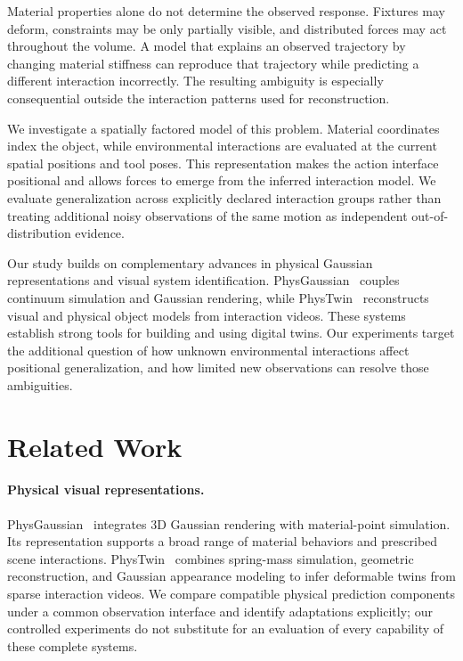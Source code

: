 \documentclass[10pt,twocolumn,letterpaper]{article}
\begin{document}
Material properties alone do not determine the observed response. Fixtures may deform, constraints may be only partially visible, and distributed forces may act throughout the volume. A model that explains an observed trajectory by changing material stiffness can reproduce that trajectory while predicting a different interaction incorrectly. The resulting ambiguity is especially consequential outside the interaction patterns used for reconstruction.

We investigate a spatially factored model of this problem. Material coordinates index the object, while environmental interactions are evaluated at the current spatial positions and tool poses. This representation makes the action interface positional and allows forces to emerge from the inferred interaction model. We evaluate generalization across explicitly declared interaction groups rather than treating additional noisy observations of the same motion as independent out-of-distribution evidence.

Our study builds on complementary advances in physical Gaussian representations and visual system identification. PhysGaussian~\cite{xie2024physgaussian} couples continuum simulation and Gaussian rendering, while PhysTwin~\cite{jiang2025phystwin} reconstructs visual and physical object models from interaction videos. These systems establish strong tools for building and using digital twins. Our experiments target the additional question of how unknown environmental interactions affect positional generalization, and how limited new observations can resolve those ambiguities.

\section{Related Work}
\paragraph{Physical visual representations.}
PhysGaussian~\cite{xie2024physgaussian} integrates 3D Gaussian rendering with material-point simulation. Its representation supports a broad range of material behaviors and prescribed scene interactions. PhysTwin~\cite{jiang2025phystwin} combines spring-mass simulation, geometric reconstruction, and Gaussian appearance modeling to infer deformable twins from sparse interaction videos. We compare compatible physical prediction components under a common observation interface and identify adaptations explicitly; our controlled experiments do not substitute for an evaluation of every capability of these complete systems.
\end{document}
